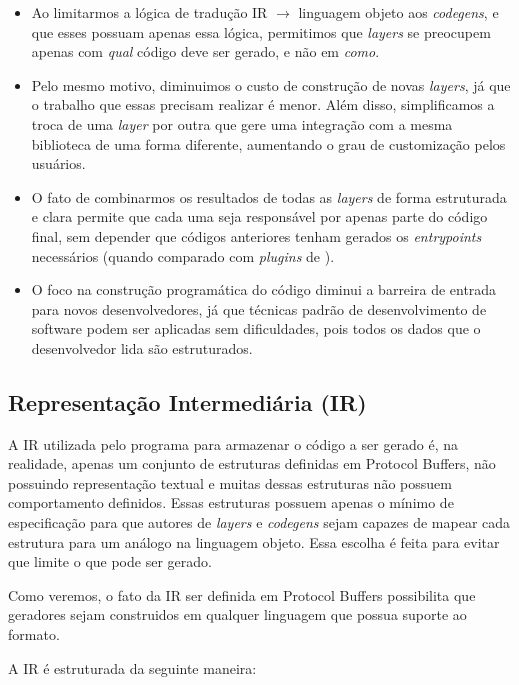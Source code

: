 \begin{itemize}
\item Ao limitarmos a lógica de tradução IR $\rightarrow$ linguagem objeto aos \textit{codegens},
  e que esses possuam apenas essa lógica, permitimos que \textit{layers} se preocupem apenas com
  \textit{qual} código deve ser gerado, e não em \textit{como}.
\item Pelo mesmo motivo, diminuimos o custo de construção de novas \textit{layers}, já que o
  trabalho que essas precisam realizar é menor. Além disso, simplificamos a troca de uma \textit{layer}
  por outra que gere uma integração com a mesma biblioteca de uma forma diferente, aumentando o
  grau de customização pelos usuários.
\item O fato de combinarmos os resultados de todas as \textit{layers} de forma estruturada e clara
  permite que cada uma seja responsável por apenas parte do código final, sem depender que códigos
  anteriores tenham gerados os \textit{entrypoints} necessários (quando comparado com
  \textit{plugins} de \cite{googl:protobuf}).
\item O foco na construção programática do código diminui a barreira de entrada para novos
  desenvolvedores, já que técnicas padrão de desenvolvimento de software podem ser aplicadas sem
  dificuldades, pois todos os dados que o desenvolvedor lida são estruturados.
\end{itemize}

\subsection{Representação Intermediária (IR)}

A IR utilizada pelo programa para armazenar o código a ser gerado é, na realidade, apenas um
conjunto de estruturas definidas em Protocol Buffers, não possuindo representação textual e
muitas dessas estruturas não possuem comportamento definidos. Essas estruturas possuem apenas
o mínimo de especificação para que autores de \textit{layers} e \textit{codegens} sejam capazes
de mapear cada estrutura para um análogo na linguagem objeto. Essa escolha é feita para evitar
que \Baker{} limite o que pode ser gerado.

Como veremos, o fato da IR ser definida em Protocol Buffers possibilita que geradores sejam
construidos em qualquer linguagem que possua suporte ao formato.

A IR é estruturada da seguinte maneira:

